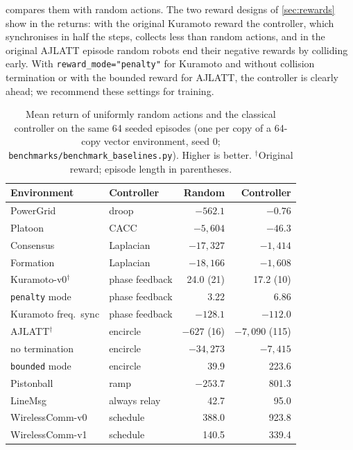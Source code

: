 \documentclass{article}
\newcommand{\code}[1]{\texttt{#1}}
\newcommand{\file}[1]{\nolinkurl{#1}}
\begin{document}
 compares them with random actions. The two reward
designs of \cref{sec:rewards} show in the returns: with the original
Kuramoto reward the controller, which synchronises in half the steps,
collects less than random actions, and in the original AJLATT episode random
robots end their negative rewards by colliding early. With
\code{reward\_mode="penalty"} for Kuramoto and without collision termination
or with the bounded reward for AJLATT, the controller is clearly ahead; we
recommend these settings for training.

\begin{table}[t]
  \caption{Mean return of uniformly random actions and the classical
    controller on the same 64 seeded episodes (one per copy of a
    64-copy vector environment, seed 0; \file{benchmarks/benchmark_baselines.py}).
    Higher is better. $^\dagger$Original reward; episode length in parentheses.}
  \label{tab:controllers}
  \centering\small
  \setlength{\tabcolsep}{2.5pt}
  \begin{tabular}{@{}llrr@{}}
    \toprule
    Environment & Controller & Random & Controller \\
    \midrule
    PowerGrid & droop & $-562.1$ & $-0.76$ \\
    Platoon & CACC & $-5{,}604$ & $-46.3$ \\
    Consensus & Laplacian & $-17{,}327$ & $-1{,}414$ \\
    Formation & Laplacian & $-18{,}166$ & $-1{,}608$ \\
    Kuramoto-v0$^\dagger$ & phase feedback & 24.0 (21) & 17.2 (10) \\
    \quad \code{penalty} mode & phase feedback & 3.22 & 6.86 \\
    Kuramoto freq.\ sync & phase feedback & $-128.1$ & $-112.0$ \\
    AJLATT$^\dagger$ & encircle & $-627$ (16) & $-7{,}090$ (115) \\
    \quad no termination & encircle & $-34{,}273$ & $-7{,}415$ \\
    \quad \code{bounded} mode & encircle & 39.9 & 223.6 \\
    Pistonball & ramp & $-253.7$ & 801.3 \\
    LineMsg & always relay & 42.7 & 95.0 \\
    WirelessComm-v0 & schedule & 388.0 & 923.8 \\
    WirelessComm-v1 & schedule & 140.5 & 339.4 \\
    \bottomrule
  \end{tabular}
\end{table}
\end{document}
